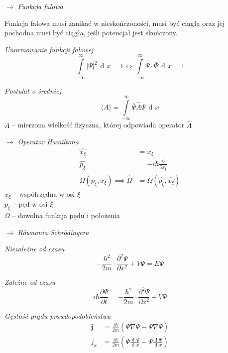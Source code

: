 \documentclass[12pt]{article}
\newenvironment{wzor}[1]{\par{\Large $\longrightarrow$ \textit{#1}}}
    {\newline {\color{grey} \rule{\linewidth}{0.3pt}}}
\DeclareMathOperator{\der}{\operatorname{d}\!}
\begin{document}
\begin{wzor}{Funkcja falowa}
    \par Funkcja falowa musi zanikać w nieskończoności, musi być ciągła oraz
    jej pochodna musi być ciągła, jeśli potencjał jest skończony.
    \par \textit{Unormowanie funkcji falowej}
    \begin{equation}
        \int\limits_{-\infty}^\infty |\Psi|^2 \, \der x = 1 \iff
            \int\limits_{-\infty}^\infty \Psi \cdot \overline{\Psi} \, \der x = 1
    \end{equation}
    \par \textit{Postulat o średniej}
    \begin{equation}
        \langle A \rangle = \int\limits_{-\infty}^\infty \overline{\Psi} \hat{A} \Psi \, \der x
    \end{equation}
    $A$ -- mierzona wielkość fizyczna, której odpowiada operator $\hat{A}$
\end{wzor}

\begin{wzor}{Operator Hamiltona}
    \begin{align}
        \hat{x_\xi} &= x_\xi\\
        \hat{p_\xi} &= -i \hbar \frac{\partial}{\partial x_\xi}\\
        \Omega(p_\xi, x_\xi) \implies \hat{\Omega} &= \Omega(\hat{p_\xi}, \hat{x_\xi})
    \end{align}
    $x_\xi$ -- współrzędna w osi $\xi$\\
    $p_\xi$ -- pęd w osi $\xi$\\
    $\Omega$ -- dowolna funkcja pędu i położenia
\end{wzor}

\newpage

\begin{wzor}{Równania Schrödingera}
    \par \textit{Niezależne od czasu}
    \begin{equation}
        -\frac{\hbar^2}{2m} \cdot \frac{\partial^2 \Psi}{\partial x^2} + V\Psi = E\Psi
    \end{equation}
    \par \textit{Zależne od czasu}
    \begin{equation}
        i\hbar \frac{\partial \Psi}{\partial t} =
            -\frac{\hbar^2}{2m}\cdot \frac{\partial^2 \Psi}{\partial x^2} + V\Psi
    \end{equation}
    \par \textit{Gęstość prądu prawdopodobieństwa}
    \begin{equation}
        \begin{split}
            \mathbf{j} &= \frac{i\hbar}{2m}
                (\Psi \nabla \overline{\Psi} - \overline{\Psi} \nabla \Psi)\\
            j_x &= \frac{i\hbar}{2m}
                \left( \Psi \frac{\der\overline{\Psi}}{\der x}
                    - \overline{\Psi} \frac{\der\Psi}{\der x} \right)
        \end{split}
    \end{equation}
\end{wzor}
\end{document}
